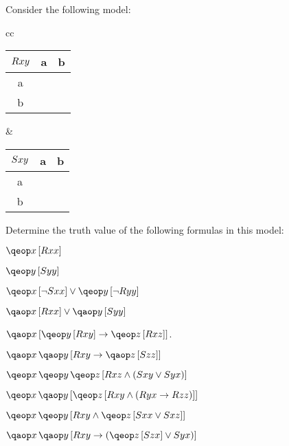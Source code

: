 \documentclass[PHIL101-Textbook.tex]{subfiles}
\begin{document}
\pagebreak
\noindent\problempart
\label{pr.TorF4}

Consider the following model:	

\begin{center}
  \begin{tabular}{cc}
	\begin{tabular}{c|cc}
	  $\mathord{R}{xy}$ & a & b\\ \hline
	  a & \vF & \vT \\
	  b & \vT & \vF \\
	\end{tabular}
  &
\begin{tabular}{c|cc}
  $\mathord{S}{xy}$ & a
  & b \\
	  \hline
	  a & \vT & \vF \\
	  b & \vF & \vT \\
\end{tabular}
\end{tabular}
\end{center}
Determine the truth value of the following formulas in this model:

\begin{earg}
\item $\qeb{x}{\atom R xx}$
\item $\qeb{y}{\atom S yy}$
\item $\qeb{x}{\enot \atom S xx} \eor \qeb{y}{\enot \atom R yy}$
\item $\qab{x}{\atom R{xx}} \eor \qab{y}{\atom S{yy}}$
\item $\qab{x}{\qeb{y}{ \atom R xy} \eif \qeb{z}{\atom R xz}}$. 
\item $\qa{x}{\qab{y}{\atom R {xy} \eif \qab{z}{ \atom S zz}}}$
\item $\qe{x}{\qe{y}{\qeb{z}{\atom R {xz} \land (\atom S{xy} \eor \atom S{yx})}}}$
\item $\qe{x}{ \qab{y}{ \qeb{z}{\atom R {xy}\land (\atom R{yx} \eif \atom R {zz})}}}$
\item $\qe{x}{\qeb{y}{\atom R{xy} \land \qeb{z}{\atom S{xx} \eor \atom S {xz}}}}$
\item $\qa{x}{\qab{y}{\atom R{xy} \eif (\qeb{z}{\atom S{zx}} \eor \atom S{yx})}}$
\end{earg}
\end{document}
